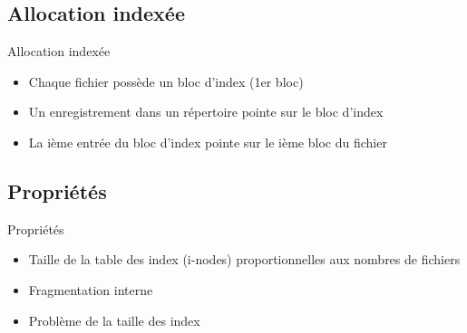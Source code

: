 \begin{frame}{\sectitle}
\def\subsectitle{Allocation indexée}
\subsection{\subsectitle}
\begin{block}{\subsectitle}
\begin{itemize}
    \item Chaque fichier possède un bloc d'index (1er bloc)
    \item Un enregistrement dans un répertoire pointe sur le bloc d'index
    \item La ième entrée du bloc d'index pointe sur le ième bloc du fichier
\end{itemize}
\end{block}


\def\subsectitle{Propriétés}
\subsection{\subsectitle}
\begin{block}{\subsectitle}
    \begin{itemize}
        \item Taille de la table des index (i-nodes) proportionnelles aux
            nombres de fichiers
        \item Fragmentation interne
        \item Problème de la taille des index
    \end{itemize}
\end{block}
\end{frame}


